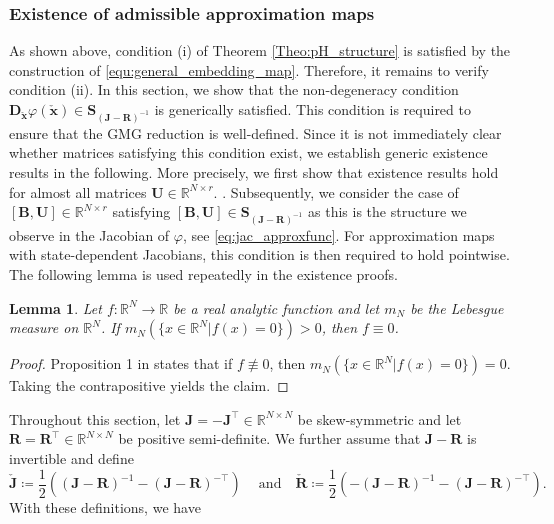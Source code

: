 \documentclass{article}
\newtheorem{lemma}[theorem]{Lemma}
\newcommand{\bmU}{\bm{U}}
\newcommand{\bmJ}{\bm{J}}
\newcommand{\bmR}{\bm{R}}
\newcommand{\bmB}{\bm{B}}
\newcommand{\bmD}{\bm{D}}
\newcommand{\R}{\mathbb{R}}
\newcommand{\stateRed}{\check{\bm x}}
\newcommand{\FOMsize}{N}
\newcommand{\ROMsize}{r}
\newcommand{\approxfunc}{\varphi}
\newcommand{\matset}{\mathbf{S}}
\newcommand{\funcJ}{\bm{J}}
\newcommand{\funcR}{\bm{R}}
\newcommand{\Jcheck}{\check{\bmJ}}
\newcommand{\Rcheck}{\check{\bmR}}
\newcommand{\GMG}{\textsf{GMG}\xspace}
\begin{document}
\subsubsection{Existence of admissible approximation maps} \label{Sec:Existence_proofs}
As shown above, condition (i) of Theorem \ref{Theo:pH_structure} is satisfied by the construction of \eqref{equ:general_embedding_map}. Therefore, it remains to verify condition (ii). In this section, we show that the non-degeneracy condition $\bmD_{\stateRed}\approxfunc(\stateRed)\in\matset_{\left(\funcJ-\funcR \right)^{-1}}$ is generically satisfied. This condition is required to ensure that the \GMG reduction is well-defined. Since it is not immediately clear whether matrices satisfying this condition exist, we establish generic existence results in the following.
More precisely, we first show that existence results hold for almost all matrices $\bmU \in \R^{ \FOMsize \times \ROMsize}$. . 
Subsequently, we consider the case of $[\bmB,\bmU] \in \R^{ \FOMsize \times \ROMsize}$ satisfying $[\bmB,\bmU] \in\matset_{\left(\funcJ-\funcR \right)^{-1}}$ as this is the structure we observe in the Jacobian of $\approxfunc$, see \eqref{eq:jac_approxfunc}. For approximation maps with state-dependent Jacobians, this condition is then required to hold pointwise. The following lemma is used repeatedly in the existence proofs. 
 \begin{lemma}
		\label{lemma:analytic_measure}
		Let $f:\R^{\FOMsize}\rightarrow\R$ be a real analytic function and let $m_{\FOMsize}$ be the Lebesgue measure on $\R^{\FOMsize}$. If $m_{\FOMsize}(\{x\in\R^{\FOMsize}| f(x)=0\})>0$, then $f\equiv0$.
	\end{lemma}
\begin{proof}
	Proposition 1 in \cite{Mityagin2020} states that if $f \not\equiv 0$, then $m_{\FOMsize}(\{x\in\R^{\FOMsize}| f(x)=0\})=0$. Taking the contrapositive yields the claim.
\end{proof}	
Throughout this section, let $\bmJ=-\bmJ^{\top}\in\R^{\FOMsize\times \FOMsize}$  be skew-symmetric and let $\bmR=\bmR^{\top} \in\R^{\FOMsize\times\FOMsize}$ be positive semi-definite. We further assume that $\bmJ-\bmR$ is invertible and define
\begin{equation}
		\label{equ:GMG_defi_Jcheck_Rcheck}
				\Jcheck \coloneq \frac{1}{2}\left((\bmJ-\bmR)^{-1} - (\bmJ-\bmR)^{-\top}\right)\ \quad \mathrm{and}\quad\Rcheck \coloneq
				\frac{1}{2} \left(-(\bmJ-\bmR)^{-1} -(\bmJ-\bmR)^{-\top}\right).
			\end{equation}
			 With these definitions, we have 
\end{document}
